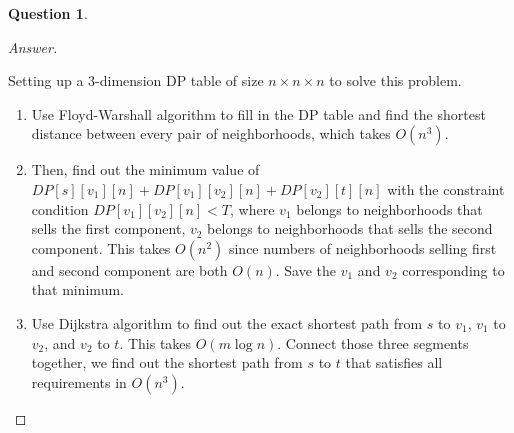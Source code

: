 \documentclass{article}
\theoremstyle{plain}
\newtheorem{question}{Question}
\newenvironment{answer}[1][Answer]
    {\begin{proof}[#1]{$ $}\renewcommand\qedsymbol{$\vartriangle$}}
    {\end{proof}}
\begin{document}
\begin{question}
\end{question}
\begin{answer}
    \begin{enumerate}
        Setting up a 3-dimension DP table of size $n \times n \times n$ to solve this problem.
        \begin{enumerate}
            \item
            Use Floyd-Warshall algorithm to fill in the DP table and find the shortest distance between every pair of neighborhoods, which takes $O(n^3)$.
            \item
            Then, find out the minimum value of $DP[s][v_1][n]+DP[v_1][v_2][n]+DP[v_2][t][n]$ with the constraint condition $DP[v_1][v_2][n] < T$, where $v_1$ belongs to neighborhoods that sells the first component, $v_2$ belongs to neighborhoods that sells the second component. This takes $O(n^2)$ since numbers of neighborhoods selling first and second component are both $O(n)$. Save the $v_1$ and $v_2$ corresponding to that minimum.
            \item
            Use Dijkstra algorithm to find out the exact shortest path from $s$ to $v_1$, $v_1$ to $v_2$, and $v_2$ to $t$. This takes $O(m \log n)$. Connect those three segments together, we find out the shortest path from $s$ to $t$ that satisfies all requirements in $O(n^3)$.
        \end{enumerate}
    \end{enumerate}
\end{answer}
\end{document}
